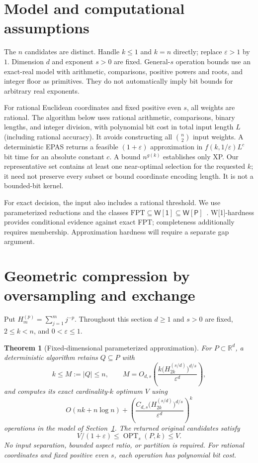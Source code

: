 \documentclass[a4paper,12pt]{article}
\newcommand{\R}{\mathbb R}
\newcommand{\OPT}{\operatorname{OPT}}
\newtheorem{theorem}{Theorem}[section]
\numberwithin{equation}{section}
\begin{document}
\section{Model and computational assumptions}\label{sec:model}
The $n$ candidates are distinct. Handle $k\le1$ and $k=n$ directly; replace $\varepsilon>1$ by
$1$. Dimension $d$ and exponent $s>0$ are fixed. General-$s$ operation bounds use an exact-real
model with arithmetic, comparisons, positive powers and roots, and integer floor as primitives.
They do not automatically imply bit bounds for arbitrary real exponents.

For rational Euclidean coordinates and fixed positive even $s$, all weights are rational. The
algorithm below uses rational arithmetic, comparisons, binary lengths, and integer division, with
polynomial bit cost in total input length $L$ (including rational accuracy). It avoids
constructing all $\binom n2$ input weights. A deterministic EPAS returns a feasible
$(1+\varepsilon)$ approximation in $f(k,1/\varepsilon)L^c$ bit time for an absolute constant $c$.
A bound $n^{g(k)}$ establishes only XP. Our representative set contains at least one near-optimal
selection for the requested $k$; it need not preserve every subset or bound coordinate encoding
length. It is not a bounded-bit kernel.

For exact decision, the input also includes a rational threshold. We use parameterized reductions
and the classes $\mathrm{FPT}\subseteq\mathsf{W[1]}\subseteq\mathsf{W[P]}$~\cite{cygan2015}.
W[1]-hardness provides conditional evidence against exact FPT; completeness additionally requires
membership. Approximation hardness will require a separate gap argument.
\section{Geometric compression by oversampling and exchange}\label{sec:epas}
Put $H_m^{(p)}=\sum_{j=1}^m j^{-p}$. Throughout this section $d\ge1$ and $s>0$ are fixed, $2\le
k<n$, and $0<\varepsilon\le1$.
\begin{theorem}[Fixed-dimensional parameterized approximation]\label{thm:exchange-epas}
For $P\subset\R^d$, a deterministic algorithm retains $Q\subseteq P$ with
\begin{equation}\label{eq:exchange-size}
 k\le M:=|Q|\le n,\qquad
 M=O_{d,s}\!\left(\frac{k\bigl(H_{2k}^{(s/d)}\bigr)^{d/s}}{\varepsilon^d}\right),
\end{equation}
and computes its exact cardinality-$k$ optimum $V$ using
\begin{equation}\label{eq:exchange-time}
 O(nk+n\log n)+
 \left(\frac{C_{d,s}\bigl(H_{2k}^{(s/d)}\bigr)^{d/s}}{\varepsilon^d}\right)^k
\end{equation}
operations in the model of Section~\ref{sec:model}. The returned original candidates satisfy
\begin{equation}\label{eq:epas-certificate}
 V/(1+\varepsilon)\le\OPT_s(P,k)\le V.
\end{equation}
No input separation, bounded aspect ratio, or partition is required. For rational coordinates and
fixed positive even $s$, each operation has polynomial bit cost.
\end{theorem}
\end{document}
